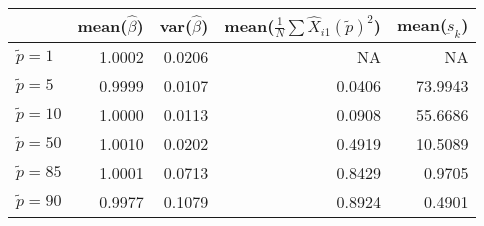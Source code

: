 
\begin{tabular}{lrrrr}
\toprule
  & mean($\hat{\beta}$) & var($\hat{\beta}$) & mean($\frac{1}{N}\sum \hat{X}_{i1}(\tilde{p})^2$) & mean($\underbar{s}_k$)\\
\midrule
$\tilde{p}=1$ & 1.0002 & 0.0206 & NA & NA\\
$\tilde{p}=5$ & 0.9999 & 0.0107 & 0.0406 & 73.9943\\
$\tilde{p}=10$ & 1.0000 & 0.0113 & 0.0908 & 55.6686\\
$\tilde{p}=50$ & 1.0010 & 0.0202 & 0.4919 & 10.5089\\
$\tilde{p}=85$ & 1.0001 & 0.0713 & 0.8429 & 0.9705\\
\addlinespace
$\tilde{p}=90$ & 0.9977 & 0.1079 & 0.8924 & 0.4901\\
\bottomrule
\end{tabular}

